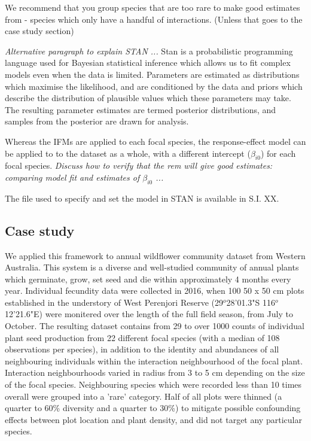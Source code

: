 \documentclass[a4,12pt]{article}
\begin{document}
        We recommend that you group species that are too rare to make good estimates from - species which only have a handful of interactions. (Unless that goes to the case study section)
    
        \textit{Alternative paragraph to explain STAN ...}
        Stan is a probabilistic programming language used for Bayesian statistical inference which allows us to fit complex models even when the data is limited. Parameters are estimated as distributions which maximise the likelihood, and are conditioned by the data and priors which describe the distribution of plausible values which these parameters may take. The resulting parameter estimates are termed posterior distributions, and samples from the posterior are drawn for analysis.
        
        Whereas the IFMs are applied to each focal species, the response-effect model can be applied to to the dataset as a whole, with a different intercept ($\beta_{i0}$) for each focal species. \textit{Discuss how to verify that the rem will give good estimates: comparing model fit and estimates of $\beta_{i0}$ ...}

        The file used to specify and set the model in STAN is available in S.I. XX. 
    
    \subsection{Case study}

        We applied this framework to annual wildflower community dataset from Western Australia. This system is a diverse and well-studied community of annual plants which germinate, grow, set seed and die within approximately 4 months every year. Individual fecundity data were collected in 2016, when 100 50 x 50 cm plots established in the understory of West Perenjori Reserve (29$^o$28'01.3"S 116$^o$12'21.6"E) were monitered over the length of the full field season, from July to October. The resulting dataset contains from 29 to over 1000 counts of individual plant seed production from 22 different focal species (with a median of 108 observations per species), in addition to the identity and abundances of all neighbouring individuals within the interaction neighbourhood of the focal plant. Interaction neighbourhoods varied in radius from 3 to 5 cm depending on the size of the focal species. Neighbouring species which were recorded less than 10 times overall were grouped into a 'rare' category. Half of all plots were thinned (a quarter to 60\% diversity and a quarter to 30\%) to mitigate possible confounding effects between plot location and plant density, and did not target any particular species.\\
\end{document}
